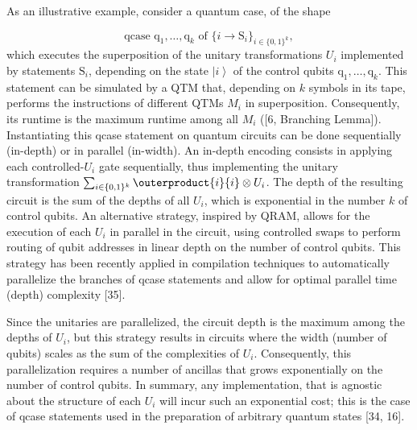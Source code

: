  
 
As an illustrative example, consider a quantum case, of the shape\par
    \[\text{{{qcase }}}\mathrm{q}_{1},\dots,\mathrm{q}_{k}\text{{{ of }}}\{i\to%
\mathrm{S}_{i}\}_{i\in\{0,1\}^{k}},\]    
which executes the superposition of the unitary transformations $U_{i}$ implemented by statements $\mathrm{S}_{i}$, depending on the state $\left|i\right\rangle$ of the control qubits $\mathrm{q}_{1},\dots,\mathrm{q}_{k}$. This statement can be simulated by a QTM that, depending on $k$ symbols in its tape, performs the instructions of different QTMs $M_{i}$ in superposition. Consequently, its runtime is the maximum runtime among all $M_{i}$ ([6, Branching Lemma]). Instantiating this qcase statement on quantum circuits can be done sequentially (in-depth) or in parallel (in-width). An in-depth encoding consists in applying each controlled-$U_{i}$ gate sequentially, thus implementing the unitary transformation $\sum_{i\in\{0,1\}^{k}}\outerproduct{i}{i}\otimes U_{i}$. The depth of the resulting circuit is the sum of the depths of all $U_{i}$, which is exponential in the number $k$ of control qubits. An alternative strategy, inspired by QRAM, allows for the execution of each $U_{i}$ in parallel in the circuit, using controlled swaps to perform routing of qubit addresses in linear depth on the number of control qubits. This strategy has been recently applied in compilation techniques to automatically parallelize the branches of qcase statements and allow for optimal parallel time (depth) complexity [35].\par
 
 
 
Since the unitaries are parallelized, the circuit depth is the maximum among the depths of $U_{i}$, but this strategy results in circuits where the width (number of qubits) scales as the sum of the complexities of $U_{i}$. Consequently, this parallelization requires a number of ancillas that grows exponentially on the number of control qubits. In summary, any implementation, that is agnostic about the structure of each $U_{i}$ will incur such an exponential cost; this is the case of qcase statements used in the preparation of arbitrary quantum states [34, 16].\par
 
 
